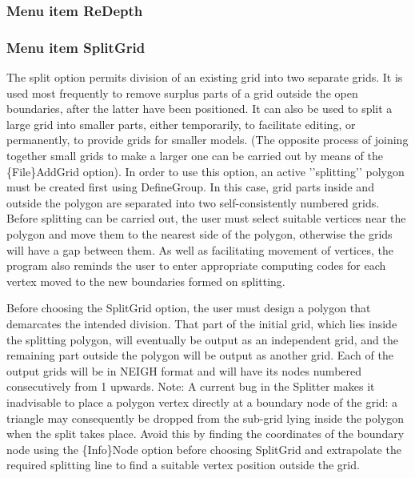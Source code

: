 \documentclass{article}
\begin{document}
\subsubsection[Menu item ReDepth]{Menu item ReDepth}

\bigskip


\bigskip

\subsubsection[Menu item SplitGrid]{Menu item SplitGrid}
The split option permits division of an existing grid into two separate grids. It is used most frequently to remove surplus parts of a grid outside the open boundaries, after the latter have been positioned. It can also be used to split a large grid into smaller parts, either temporarily, to facilitate editing, or permanently, to provide grids for smaller models. (The opposite process of joining together small grids to make a larger one can be carried out by means of the \{File\}AddGrid option). In order to use this option, an active '{}'splitting'{}' polygon must be created first using DefineGroup. In this case, grid parts inside and outside the polygon are separated into two self-consistently numbered grids. Before splitting can be carried out, the user must select suitable vertices near the polygon and move them to the nearest side of the polygon, otherwise the grids will have a gap between them. As well as facilitating movement of vertices, the program also reminds the user to enter appropriate computing 
codes for each vertex moved to the new boundaries formed on splitting.

Before choosing the SplitGrid option, the user must design a polygon that demarcates the intended division. That part of the initial grid, which lies inside the splitting polygon, will eventually be output as an independent grid, and the remaining part outside the polygon will be output as another grid. Each of the output grids will be in NEIGH format and will have its nodes numbered consecutively from 1 upwards. Note: A current bug in the Splitter makes it inadvisable to place a polygon vertex directly at a boundary node of the grid: a triangle may consequently be dropped from the sub-grid lying inside the polygon when the split takes place. Avoid this by finding the coordinates of the boundary node using the \{Info\}Node option before choosing SplitGrid and extrapolate the required splitting line to find a suitable vertex position outside the grid.
\end{document}
